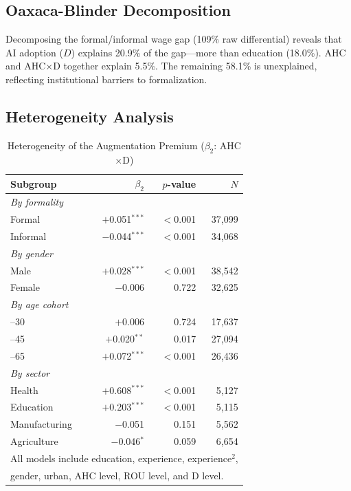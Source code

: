 \documentclass[11pt,a4paper]{article}
\theoremstyle{definition}
\begin{document}
\subsection{Oaxaca-Blinder Decomposition}

Decomposing the formal/informal wage gap (109\% raw differential) reveals that AI adoption ($D$) explains 20.9\% of the gap---more than education (18.0\%). AHC and AHC$\times$D together explain 5.5\%. The remaining 58.1\% is unexplained, reflecting institutional barriers to formalization.

\subsection{Heterogeneity Analysis}

\begin{table}[htbp]
\centering
\caption{Heterogeneity of the Augmentation Premium ($\beta_2$: AHC$\times$D)}
\label{tab:heterogeneity}
\begin{tabular}{lrrr}
\toprule
Subgroup & $\beta_2$ & $p$-value & $N$ \\
\midrule
\multicolumn{4}{l}{\textit{By formality}} \\
\quad Formal & $+$0.051$^{***}$ & $<$0.001 & 37,099 \\
\quad Informal & $-$0.044$^{***}$ & $<$0.001 & 34,068 \\[4pt]
\multicolumn{4}{l}{\textit{By gender}} \\
\quad Male & $+$0.028$^{***}$ & $<$0.001 & 38,542 \\
\quad Female & $-$0.006 & 0.722 & 32,625 \\[4pt]
\multicolumn{4}{l}{\textit{By age cohort}} \\
\quad 18--30 & $+$0.006 & 0.724 & 17,637 \\
\quad 31--45 & $+$0.020$^{**}$ & 0.017 & 27,094 \\
\quad 46--65 & $+$0.072$^{***}$ & $<$0.001 & 26,436 \\[4pt]
\multicolumn{4}{l}{\textit{By sector}} \\
\quad Health & $+$0.608$^{***}$ & $<$0.001 & 5,127 \\
\quad Education & $+$0.203$^{***}$ & $<$0.001 & 5,115 \\
\quad Manufacturing & $-$0.051 & 0.151 & 5,562 \\
\quad Agriculture & $-$0.046$^{*}$ & 0.059 & 6,654 \\
\bottomrule
\multicolumn{4}{l}{\footnotesize All models include education, experience, experience$^2$,}\\
\multicolumn{4}{l}{\footnotesize gender, urban, AHC level, ROU level, and D level.}
\end{tabular}
\end{table}
\end{document}
